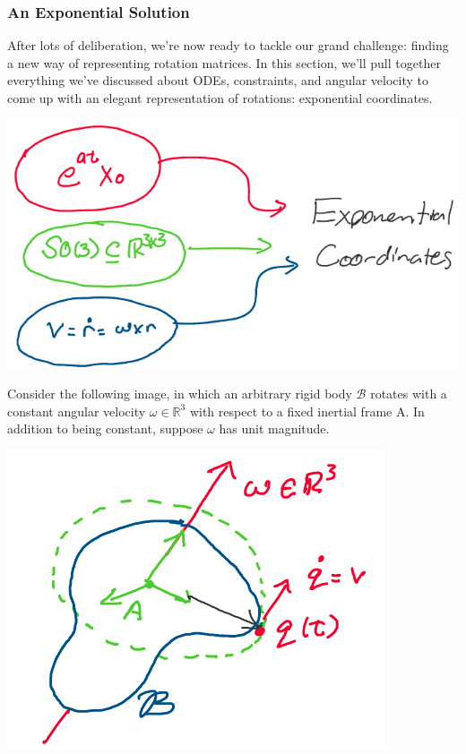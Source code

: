 \documentclass[oneside]{book}
\begin{document}
\subsubsection{An Exponential Solution}
After lots of deliberation, we're now ready to tackle our grand challenge: finding a new way of representing rotation matrices. In this section, we'll pull together everything we've discussed about ODEs, constraints, and angular velocity to come up with an elegant representation of rotations: exponential coordinates.
\begin{center}
    \includegraphics[scale=0.3]{images/expcoords.png}
\end{center}
Consider the following image, in which an arbitrary rigid body $\mathcal{B}$ rotates with a constant angular velocity $\omega \in \mathbb{R}^3$ with respect to a fixed inertial frame A. In addition to being constant, suppose $\omega$ has unit magnitude.\\
\begin{center}
    \includegraphics[scale=0.5]{images/rotating.png}
\end{center}
\end{document}
